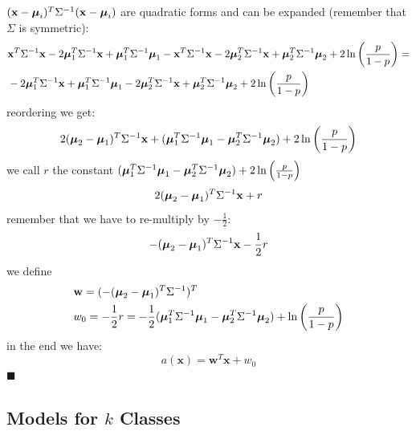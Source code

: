 \documentclass[10pt, letterpaper]{report}
\begin{document}
$(\mathbf x-{\boldsymbol{\mu}}_i)^T\Sigma^{-1}(\mathbf x-{\boldsymbol{\mu}}_i)$ are quadratic forms and can be expanded (remember that $\Sigma$ is symmetric):
\begin{align}
	 & \mathbf x^T\Sigma^{-1}\mathbf x-2{\boldsymbol{\mu}}_1^T\Sigma^{-1}\mathbf x+{\boldsymbol{\mu}}_1^T\Sigma^{-1}{\boldsymbol{\mu}}_1
	-
	\mathbf x^T\Sigma^{-1}\mathbf x-2{\boldsymbol{\mu}}_2^T\Sigma^{-1}\mathbf x+{\boldsymbol{\mu}}_2^T\Sigma^{-1}{\boldsymbol{\mu}}_2
	+
	2\ln\left(\frac{p}{1-p}\right)=                                                            \\
	 & -2{\boldsymbol{\mu}}_1^T\Sigma^{-1}\mathbf x+{\boldsymbol{\mu}}_1^T\Sigma^{-1}{\boldsymbol{\mu}}_1
	-2{\boldsymbol{\mu}}_2^T\Sigma^{-1}\mathbf x+{\boldsymbol{\mu}}_2^T\Sigma^{-1}{\boldsymbol{\mu}}_2
	+
	2\ln\left(\frac{p}{1-p}\right)
\end{align}
reordering we get:\begin{equation}
	2({\boldsymbol{\mu}}_2-{\boldsymbol{\mu}}_1)^T\Sigma^{-1}\mathbf x+({\boldsymbol{\mu}}_1^T\Sigma^{-1}{\boldsymbol{\mu}}_1-{\boldsymbol{\mu}}_2^T\Sigma^{-1}{\boldsymbol{\mu}}_2)+
	2\ln\left(\frac{p}{1-p}\right)
\end{equation}
we call $r$ the constant $({\boldsymbol{\mu}}_1^T\Sigma^{-1}{\boldsymbol{\mu}}_1-{\boldsymbol{\mu}}_2^T\Sigma^{-1}{\boldsymbol{\mu}}_2)+
	2\ln\left(\frac{p}{1-p}\right)$
\begin{equation}
	2({\boldsymbol{\mu}}_2-{\boldsymbol{\mu}}_1)^T\Sigma^{-1}\mathbf x+r
\end{equation}
remember that we have to re-multiply by $-\frac{1}{2}$:
\begin{equation}
	-({\boldsymbol{\mu}}_2-{\boldsymbol{\mu}}_1)^T\Sigma^{-1}\mathbf x-\frac{1}{2}r
\end{equation}
we define\begin{align}
	 & \mathbf w=(-({\boldsymbol{\mu}}_2-{\boldsymbol{\mu}}_1)^T\Sigma^{-1})^T                                           \\
	 & w_0=-\frac{1}{2}r=-\frac{1}{2} ({\boldsymbol{\mu}}_1^T\Sigma^{-1}{\boldsymbol{\mu}}_1-{\boldsymbol{\mu}}_2^T\Sigma^{-1}{\boldsymbol{\mu}}_2)+
	\ln\left(\frac{p}{1-p}\right)
\end{align}
in the end we have:\begin{equation}
	a(\mathbf x)=\mathbf w^T\mathbf x+w_0
\end{equation}
\hfill$\blacksquare$
\subsection{Models for $k$ Classes}

%
\cite{} %
%
%
\end{document}
